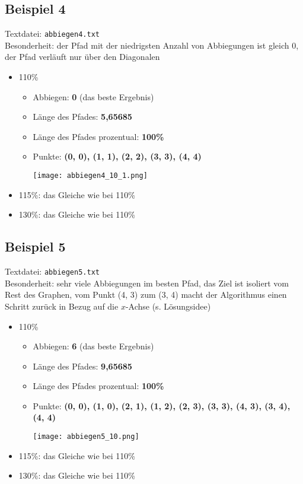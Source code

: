 \documentclass[a4paper,10pt,ngerman]{scrartcl}
\begin{document}
\subsection{Beispiel 4}
Textdatei: \texttt{abbiegen4.txt}\\
Besonderheit: der Pfad mit der niedrigsten Anzahl von Abbiegungen ist gleich 0, der Pfad verläuft nur über den
Diagonalen

\begin{itemize}
  \item 110\%    
    \begin{itemize}
      \item Abbiegen: \textbf{0} (das beste Ergebnis)
      \item Länge des Pfades: \textbf{5,65685}
      \item Länge des Pfades prozentual: \textbf{100\%}
      \item Punkte: \textbf{(0, 0), (1, 1), (2, 2), (3, 3), (4, 4)}
\begin{center}
\texttt{[image: abbiegen4\_10\_1.png]}
\end{center}
  \end{itemize}
  \item 115\%: das Gleiche wie bei 110\%
  \item 130\%: das Gleiche wie bei 110\%
\end{itemize}

\subsection{Beispiel 5}
Textdatei: \texttt{abbiegen5.txt}\\
Besonderheit: sehr viele Abbiegungen im besten Pfad, das Ziel ist isoliert vom Rest des Graphen,
vom Punkt (4, 3) zum (3, 4) macht der Algorithmus einen Schritt zurück in Bezug auf die $x$-Achse (s. Lösungsidee)

\begin{itemize}
  \item 110\%    
    \begin{itemize}
      \item Abbiegen: \textbf{6} (das beste Ergebnis)
      \item Länge des Pfades: \textbf{9,65685}
      \item Länge des Pfades prozentual: \textbf{100\%}
      \item Punkte: \textbf{(0, 0), (1, 0), (2, 1), (1, 2), (2, 3), (3, 3), (4, 3), (3, 4), (4, 4)}
\begin{center}
\texttt{[image: abbiegen5\_10.png]}
\end{center}
  \end{itemize}
  \item 115\%: das Gleiche wie bei 110\%
  \item 130\%: das Gleiche wie bei 110\%
\end{itemize}
\end{document}
